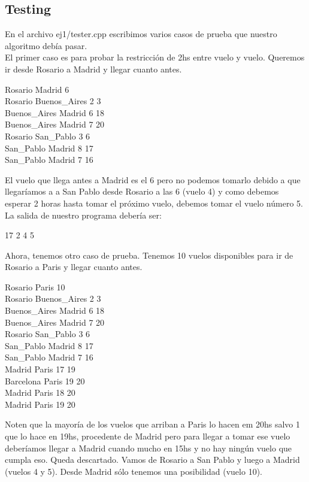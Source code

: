 \subsection{Testing}
En el archivo ej1/tester.cpp escribimos varios casos de prueba que nuestro algoritmo debía pasar.\\

El primer caso es para probar la restricción de 2hs entre vuelo y vuelo. Queremos ir desde Rosario a Madrid y llegar cuanto antes.

\begin{codebox}
Rosario Madrid 6\\
Rosario Buenos\_Aires 2 3\\
Buenos\_Aires Madrid 6 18\\
Buenos\_Aires Madrid 7 20\\
Rosario San\_Pablo 3 6\\
San\_Pablo Madrid 8 17\\
San\_Pablo Madrid 7 16\\
\end{codebox}

El vuelo que llega antes a Madrid es el 6 pero no podemos tomarlo debido a que llegaríamos a a San Pablo desde Rosario a las 6 (vuelo 4) y como debemos esperar
2 horas hasta tomar el próximo vuelo, debemos tomar el vuelo número 5. La salida de nuestro programa debería ser:
\begin{codebox}
17 2 4 5
\end{codebox}

Ahora, tenemos otro caso de prueba. Tenemos 10 vuelos disponibles para ir de Rosario a Paris y llegar cuanto antes.

\begin{codebox}
Rosario Paris 10\\
Rosario Buenos\_Aires 2 3\\
Buenos\_Aires Madrid 6 18\\
Buenos\_Aires Madrid 7 20\\
Rosario San\_Pablo 3 6\\
San\_Pablo Madrid 8 17\\
San\_Pablo Madrid 7 16\\
Madrid Paris 17 19\\
Barcelona Paris 19 20\\
Madrid Paris 18 20\\
Madrid Paris 19 20\\
\end{codebox}

Noten que la mayoría de los vuelos que arriban a Paris lo hacen em 20hs salvo 1 que lo hace en 19hs, procedente de Madrid pero para llegar a tomar
ese vuelo deberíamos llegar a Madrid cuando mucho en 15hs y no hay ningún vuelo que cumpla eso. Queda descartado. Vamos de Rosario a San Pablo 
y luego a Madrid (vuelos 4 y 5). Desde Madrid sólo tenemos una posibilidad (vuelo 10).

